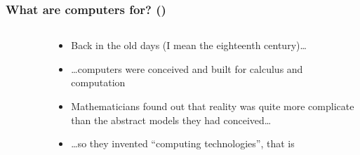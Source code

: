 \documentclass[\printmode,compress,xcolor=dvipsnames]{beamer}
\begin{document}

\setcounter{ms}{0}
\begin{frame}
  \frametitle<+->{What are computers for? ()}

  \begin{columns}[T]
    \begin{column}{\leftcolumn}
      \begin{figure}[H!]
      \end{figure}
    \end{column}
    \begin{column}{\rightcolumn}
      \begin{itemize}[<+- | alert@+->]

          \item Back in the old days (I mean the eighteenth century)\dots

          \item \dots computers were conceived and built for calculus and
                  computation

          \item Mathematicians found out that reality was quite more
                complicate than the abstract models they had conceived\dots

          \item \dots so they invented ``computing technologies'', that is
                  

      \end{itemize}
    \end{column}
  \end{columns}
\end{frame}
\end{document}
